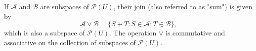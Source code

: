 If $\mathcal{A}$ and $\mathcal{B}$ are subspaces of $\mathcal{P}(U)$, their join (also referred to as "sum") is given by
$$\mathcal{A} \vee \mathcal{B} = \{S + T: S \in \mathcal{A}; T \in \mathcal{B}\},$$
which is also a subspace of $\mathcal{P}(U)$. The operation $\vee$ is commutative and associative on the collection of subspaces of $\mathcal{P}(U)$.
